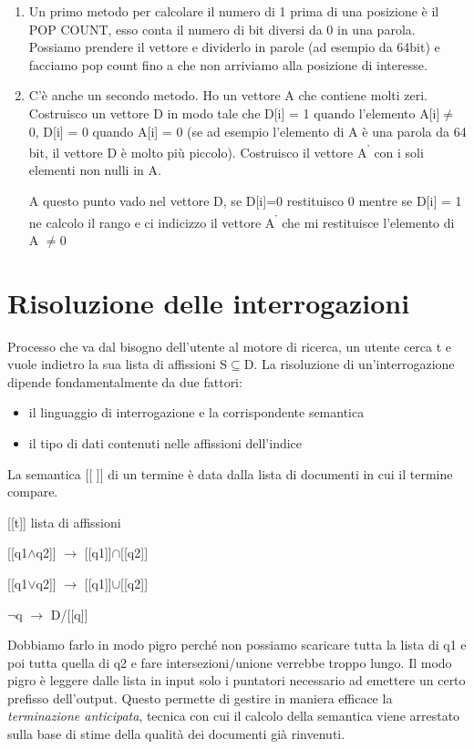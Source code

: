 \documentclass[12pt,italian]{report}
\begin{document}
\begin{enumerate}
    \item Un primo metodo per calcolare il numero di 1 prima di una posizione è il POP COUNT, esso conta il numero di bit diversi da 0 in una parola. Possiamo prendere il vettore e dividerlo in parole (ad esempio da 64bit) e facciamo pop count fino a che non arriviamo alla posizione di interesse.
    \item C'è anche un secondo metodo. Ho un vettore A che contiene molti zeri. Costruisco un vettore D in modo tale che D[i] = 1 quando l'elemento A[i]$\ne$ 0, D[i] = 0 quando A[i] = 0 (se ad esempio l'elemento di A è una parola da 64 bit, il vettore D è molto più piccolo). Costruisco il vettore A\textsuperscript{'} con i soli elementi non nulli in A.

    A questo punto vado nel vettore D, se D[i]=0 restituisco 0 mentre se D[i] = 1 ne calcolo il rango e ci indicizzo il vettore A\textsuperscript{'} che mi restituisce l'elemento di A $\ne$0
\end{enumerate}

\chapter{Risoluzione delle interrogazioni}
\label{risoluzionedelleinterrogazioni}
Processo che va dal bisogno dell'utente al motore di ricerca, un utente cerca t e vuole indietro la sua lista di affissioni S$\subseteq$D.
La risoluzione di un'interrogazione dipende fondamentalmente da due fattori:
\begin{itemize}
    \item il linguaggio di interrogazione e la corrispondente semantica
    \item il tipo di dati contenuti nelle affissioni dell'indice
\end{itemize}
\noindent La semantica [[ ]] di un termine è data dalla lista di documenti in cui il termine compare. 
\bigbreak

    [[t]] lista di affissioni
    
    [[q1$\land$q2]] $\to$  [[q1]]$\cap$[[q2]]
    
    [[q1$\lor$q2]] $\to$  [[q1]]$\cup$[[q2]]
    
    $\neg$q $\to$ D/[[q]]
    
\bigbreak
\noindent Dobbiamo farlo in modo pigro perché non possiamo scaricare tutta la lista di q1 e poi tutta quella di q2 e fare intersezioni/unione verrebbe troppo lungo. Il modo pigro è leggere dalle lista in input solo i puntatori necessario ad emettere un certo prefisso dell'output. Questo permette di gestire in maniera efficace la \textit{terminazione anticipata}, tecnica con cui il calcolo della semantica viene arrestato sulla base di stime della qualità dei documenti già rinvenuti.
\end{document}
